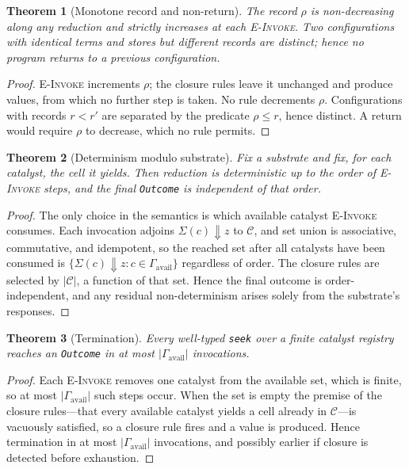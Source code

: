 \documentclass[11pt,a4paper]{article}
\theoremstyle{thmstyle}
\newtheorem{theorem}{Theorem}[section]
\theoremstyle{definition}
\theoremstyle{remark}
\newcommand{\store}{\Sigma}
\newcommand{\abs}[1]{\lvert#1\rvert}
\begin{document}
\begin{theorem}[Monotone record and non-return]
\label{thm:monotone}
The record $\rho$ is non-decreasing along any reduction and strictly
increases at each \textsc{E-Invoke}. Two configurations with identical terms
and stores but different records are distinct; hence no program returns to a
previous configuration.
\end{theorem}

\begin{proof}
\textsc{E-Invoke} increments $\rho$; the closure rules leave it unchanged
and produce values, from which no further step is taken. No rule decrements
$\rho$. Configurations with records $r<r'$ are separated by the predicate
$\rho\le r$, hence distinct. A return would require $\rho$ to decrease,
which no rule permits.
\end{proof}

\begin{theorem}[Determinism modulo substrate]
\label{thm:determinism}
Fix a substrate and fix, for each catalyst, the cell it yields. Then
reduction is deterministic up to the order of \textsc{E-Invoke} steps, and
the final \texttt{Outcome} is independent of that order.
\end{theorem}

\begin{proof}
The only choice in the semantics is which available catalyst
\textsc{E-Invoke} consumes. Each invocation adjoins $\store(c)\Downarrow z$
to $\mathcal{C}$, and set union is associative, commutative, and idempotent,
so the reached set after all catalysts have been consumed is
$\{\store(c)\Downarrow z : c\in\Gamma_{\mathrm{avail}}\}$ regardless of
order. The closure rules are selected by $\abs{\mathcal{C}}$, a function of
that set. Hence the final outcome is order-independent, and any residual
non-determinism arises solely from the substrate's responses.
\end{proof}

\begin{theorem}[Termination]
\label{thm:termination}
Every well-typed \texttt{seek} over a finite catalyst registry reaches an
\texttt{Outcome} in at most $\abs{\Gamma_{\mathrm{avail}}}$ invocations.
\end{theorem}

\begin{proof}
Each \textsc{E-Invoke} removes one catalyst from the available set, which is
finite, so at most $\abs{\Gamma_{\mathrm{avail}}}$ such steps occur. When the
set is empty the premise of the closure rules---that every available
catalyst yields a cell already in $\mathcal{C}$---is vacuously satisfied, so
a closure rule fires and a value is produced. Hence termination in at most
$\abs{\Gamma_{\mathrm{avail}}}$ invocations, and possibly earlier if closure
is detected before exhaustion.
\end{proof}
\end{document}
